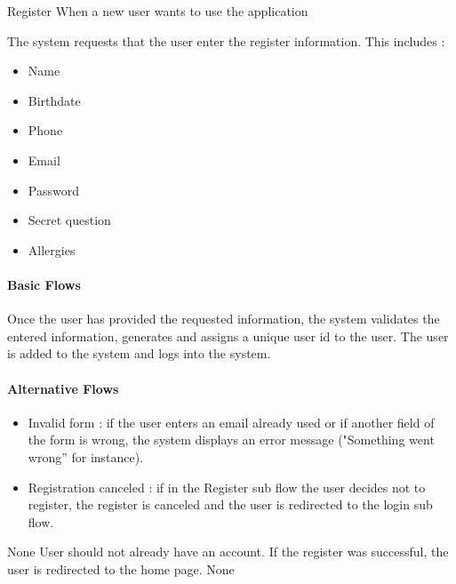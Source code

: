 \usecasedesc
{Register}
{When a new user wants to use the application}
{
  The system requests that the user enter the register information. This includes :
  \begin{itemize}
    \item Name
    \item Birthdate
    \item Phone
    \item Email
    \item Password
    \item Secret question
    \item Allergies
  \end{itemize}

  \paragraph{Basic Flows}
  Once the user has provided the requested information, the system validates the entered information, generates and assigns a unique user id to the user. The user is added to the system and logs into the system.
  \paragraph{Alternative Flows}
  \begin{itemize}
    \item Invalid form : if the user enters an email already used or if another field of the form is wrong, the system displays an error message ("Something went wrong” for instance).
    \item Registration canceled : if in the Register sub flow the user decides not to register, the register is canceled and the user is redirected to the login sub flow.
  \end{itemize}
}
{None}
{User should not already have an account.}
{If the register was successful, the user is redirected to the home page.}
{None}

